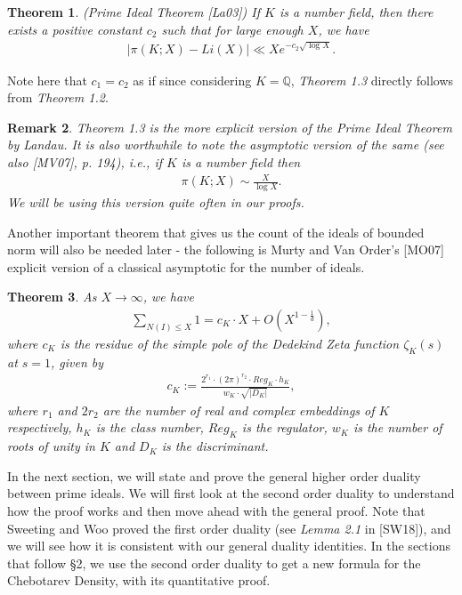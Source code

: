 \documentclass[12pt]{article}
\numberwithin{equation}{section}
\newtheorem{theorem}{Theorem}[section]
\newtheorem{remark}[theorem]{Remark}
\numberwithin{equation}{section}
\begin{document}
\begin{theorem}
    (Prime Ideal Theorem [La03]) If $K$ is a number field, then there exists a positive constant $c_2$ such that for large enough $X$, we have
    \begin{align}
        |\pi(K;X)-Li(X)| \ll Xe^{-c_2\sqrt{\log X}} .\nonumber
    \end{align}
\end{theorem}
\noindent Note here that $c_1=c_2$ as if since considering $K = \mathbb{Q}$, \textit{Theorem 1.3} directly follows from \textit{Theorem 1.2}.
\begin{remark}
    Theorem 1.3 is the more explicit version of the Prime Ideal Theorem by Landau. It is also worthwhile to note the asymptotic version of the same (see also [MV07], p. 194), i.e., if $K$ is a number field then 
    \begin{align}
        \pi(K;X) \sim \frac{X}{\log X} .\nonumber
    \end{align}
    We will be using this version quite often in our proofs.
\end{remark}
\noindent Another important theorem that gives us the count of the ideals of bounded norm will also be needed later - the following is Murty and Van Order's [MO07] explicit version of a classical asymptotic for the number of ideals.
\begin{theorem}
    As $X \to \infty$, we have
    \begin{align}
        \sum_{N(I)\leq X}1 = c_K\cdot X +O\left(X^{1-\frac{1}{d}}\right), \nonumber
    \end{align}
    where $c_K$ is the residue of the simple pole of the Dedekind Zeta function $\zeta_K(s)$ at $s=1$, given by
    \begin{align}
        c_K:= \frac{2^{r_1}\cdot (2\pi)^{r_2}\cdot Reg_K\cdot h_K}{w_K\cdot \sqrt{|D_K|}}, \nonumber
    \end{align}
    where $r_1$ and $2r_2$ are the number of real and complex embeddings of $K$ respectively, $h_K$ is the class number, $Reg_K$ is the regulator, $w_K$ is the number of roots of unity in $K$ and $D_K$ is the discriminant.
\end{theorem}
\noindent In the next section, we will state and prove the general higher order duality between prime ideals. We will first look at the second order duality to understand how the proof works and then move ahead with the general proof. Note that Sweeting and Woo proved the first order duality (see \textit{Lemma 2.1} in [SW18]), and we will see how it is consistent with our general duality identities. In the sections that follow \S2, we use the second order duality to get a new formula for the Chebotarev Density, with its quantitative proof. 
\end{document}
